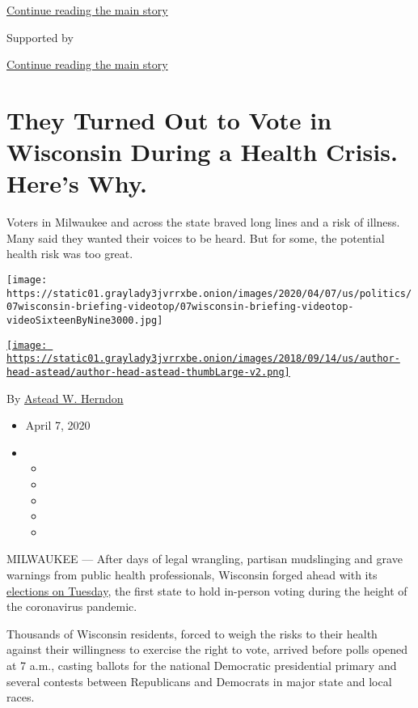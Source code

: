 \protect\hyperlink{after-top}{Continue reading the main story}

Supported by

\protect\hyperlink{after-sponsor}{Continue reading the main story}

\hypertarget{they-turned-out-to-vote-in-wisconsin-during-a-health-crisis-heres-why}{%
\section{They Turned Out to Vote in Wisconsin During a Health Crisis.
Here's
Why.}\label{they-turned-out-to-vote-in-wisconsin-during-a-health-crisis-heres-why}}

Voters in Milwaukee and across the state braved long lines and a risk of
illness. Many said they wanted their voices to be heard. But for some,
the potential health risk was too great.

\texttt{[image: https://static01.graylady3jvrrxbe.onion/images/2020/04/07/us/politics/07wisconsin-briefing-videotop/07wisconsin-briefing-videotop-videoSixteenByNine3000.jpg]}

\href{https://www.nytimes3xbfgragh.onion/by/astead-w-herndon}{\texttt{[image: https://static01.graylady3jvrrxbe.onion/images/2018/09/14/us/author-head-astead/author-head-astead-thumbLarge-v2.png]}}

By \href{https://www.nytimes3xbfgragh.onion/by/astead-w-herndon}{Astead
W. Herndon}

\begin{itemize}
\item
  April 7, 2020
\item
  \begin{itemize}
  \item
  \item
  \item
  \item
  \item
  \end{itemize}
\end{itemize}

MILWAUKEE --- After days of legal wrangling, partisan mudslinging and
grave warnings from public health professionals, Wisconsin forged ahead
with its
\href{https://www.nytimes3xbfgragh.onion/2020/04/07/us/politics/wisconsin-primary-election.html}{elections
on Tuesday}, the first state to hold in-person voting during the height
of the coronavirus pandemic.

Thousands of Wisconsin residents, forced to weigh the risks to their
health against their willingness to exercise the right to vote, arrived
before polls opened at 7 a.m., casting ballots for the national
Democratic presidential primary and several contests between Republicans
and Democrats in major state and local races.

